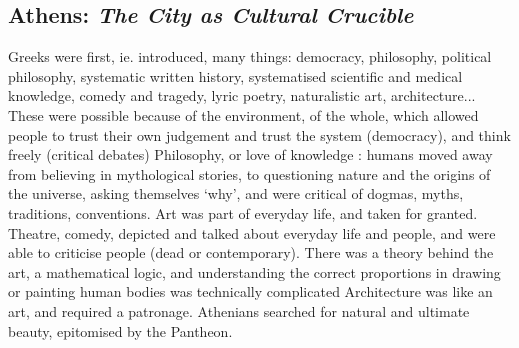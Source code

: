 \documentclass{article}
\begin{document}
\subsection{Athens: \textit{The City as Cultural Crucible} \parencite{hall1998cities}}

\begin{outline}
	\1 Greeks were first, ie. introduced, many things: democracy, philosophy, political philosophy, systematic written history, systematised scientific and medical knowledge, comedy and tragedy, lyric poetry, naturalistic art, architecture... These were possible because of the environment, of the whole, which allowed people to trust their own judgement and trust the system (democracy), and think freely (critical debates)
	\1 Philosophy, or love of knowledge : humans moved away from believing in mythological stories, to questioning nature and the origins of the universe, asking themselves `why', and were critical of dogmas, myths, traditions, conventions.
	\1 Art was part of everyday life, and taken for granted. Theatre, comedy, depicted and talked about everyday life and people, and were able to criticise people (dead or contemporary). There was a theory behind the art, a mathematical logic, and understanding the correct proportions in drawing or painting human bodies was technically complicated
	\1 Architecture was like an art, and required a patronage. Athenians searched for natural and ultimate beauty, epitomised by the Pantheon. 

\end{outline}

\subsection{}

\begin{outline}
	\1
\end{outline}


\subsection{}

\begin{outline}
	\1
\end{outline}


\subsection{}

\begin{outline}
	\1
\end{outline}


\subsection{}

\begin{outline}
	\1
\end{outline}


\subsection{}

\begin{outline}
	\1
\end{outline}

\printbibliography
\end{document}
